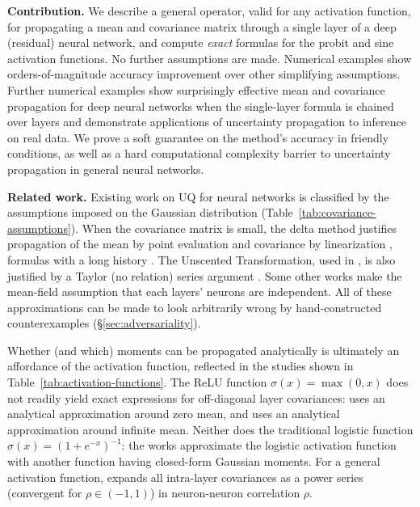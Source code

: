 \documentclass{article}
\begin{document}
\textbf{Contribution.} We describe a general operator, valid for any activation function, for propagating a mean and covariance matrix through a single layer of a deep (residual) neural network, and compute \emph{exact} formulas for the probit and sine activation functions.
No further assumptions are made.
Numerical examples show orders-of-magnitude accuracy improvement over other simplifying assumptions.
Further numerical examples show surprisingly effective mean and covariance propagation for deep neural networks when the single-layer formula is chained over layers and demonstrate applications of uncertainty propagation to inference on real data.
We prove a soft guarantee on the method's accuracy in friendly conditions, as well as a hard computational complexity barrier to uncertainty propagation in general neural networks.



\textbf{Related work.}
Existing work on UQ for neural networks is classified by the assumptions imposed on the Gaussian distribution (Table~\ref{tab:covariance-assumptions}).
When the covariance matrix is small, the delta method justifies propagation of the mean by point evaluation and covariance by linearization \cite{titensky_uncertainty_2018,nagel_kalman-bucy-informed_2022,petersen_uncertainty_2024,jungmann_analytical_2025}, formulas with a long history \citep[Chapter 187]{gauss_theory_1857} \citep{taylor_introduction_1997}.
The Unscented Transformation, used in \citet{astudillo_propagation_2011,abdelaziz_uncertainty_2015}, is also justified by a Taylor (no relation) series argument \citep{julier_scaled_2002}.
Some other works \citep{huber_bayesian_2020,wagner_kalman_2022,akgul_deterministic_2025} make the mean-field assumption that each layers' neurons are independent.
All of these approximations can be made to look arbitrarily wrong by hand-constructed counterexamples (\S\ref{sec:adversariality}).


Whether (and which) moments can be propagated analytically is ultimately an affordance of the activation function, reflected in the studies shown in Table~\ref{tab:activation-functions}.
The ReLU function \(\sigma(x) = \max(0, x)\) does not readily yield exact expressions for off-diagonal layer covariances:
\citet{bibi_analytic_2018} uses an analytical approximation around zero mean, and \citet{wu_deterministic_2019} uses an analytical approximation around infinite mean.
Neither does the traditional logistic function \(\sigma(x) = (1 + e^{-x})^{-1}\):
the works  \citet{astudillo_propagation_2011,abdelaziz_uncertainty_2015,huber_bayesian_2020} approximate the logistic activation function with another function having closed-form Gaussian moments.
For a general activation function, 
\citet{wright_analytic_2024} expands all intra-layer covariances as a power series (convergent for \(\rho \in (-1, 1)\)) in neuron-neuron correlation \(\rho\).
\end{document}
